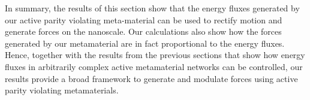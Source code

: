\documentclass[
 preprint,
 preprintnumbers,
 amsmath,amssymb,
 aps,
 pre,
 longbibliography,
 superscriptaddress,
 10pt, twocolumn
]{revtex4-1}
\begin{document}
In summary, the results of this section show that the energy fluxes generated by our active parity violating meta-material can be used to rectify motion and generate forces on the nanoscale. Our calculations also show how the forces generated by our metamaterial are in fact proportional to the energy fluxes. Hence, together with the results from the previous sections that show how energy fluxes in arbitrarily complex active metamaterial networks can be controlled, our results provide a broad framework to generate and modulate forces using active parity violating metamaterials.  




\end{document}
